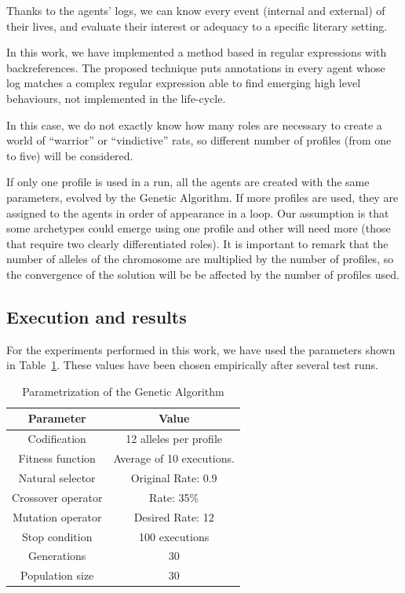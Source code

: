 \documentclass[letterpaper]{article}
\begin{document}
Thanks to the agents' logs, we can know every event (internal and
external) of their lives, and evaluate their interest or
adequacy to a specific literary setting.

In this work, we have implemented a method based in regular expressions with backreferences. The proposed technique puts annotations in every agent whose log matches a complex regular expression able to find emerging high level behaviours, not implemented in the life-cycle.




In this case,
 we do not exactly know how many roles are necessary to create a world of ``warrior'' or ``vindictive''
  rats, so different number of profiles (from one to five) will be considered.




If only one profile is used
in a run, all the agents are created with the same parameters, evolved
by the Genetic Algorithm. If more profiles are used, they are assigned
to the agents in order of appearance in a loop. Our assumption is that
some archetypes could emerge using one profile and other will need
more (those that require two clearly differentiated roles). It is
important to remark that the number of alleles of the chromosome are
multiplied by the number of profiles, so the convergence of the
solution will be be affected by the number of profiles used. 




\subsection{Execution and results}

For the experiments performed in this work, we have used the parameters shown in Table~\ref{fig:ga_parameters}. These values have been chosen empirically after several test runs.


\begin{table}
\begin{center}

\begin{tabular}{|c|c|}%
\hline
Parameter & Value \\
\hline\hline
Codification & 12 alleles per profile\\
Fitness function & Average of 10 executions.\\
Natural selector & Original Rate: 0.9 \\
Crossover operator & Rate: 35\% \\
Mutation operator & Desired Rate: 12 \\
Stop condition & 100 executions\\
Generations & 30\\
Population size & 30 \\
\hline
\end{tabular}


\end{center}
\vskip 0.25cm
\caption{Parametrization of the Genetic Algorithm}
\label{fig:ga_parameters}
\end{table}
\end{document}
